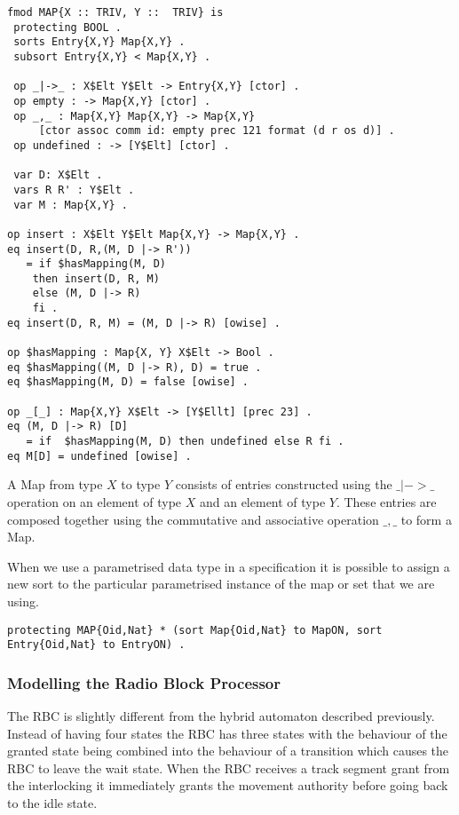 \begin{lstlisting}[caption = The specification of the Map data type in Maude]
fmod MAP{X :: TRIV, Y ::  TRIV} is
 protecting BOOL .
 sorts Entry{X,Y} Map{X,Y} .
 subsort Entry{X,Y} < Map{X,Y} .

 op _|->_ : X$Elt Y$Elt -> Entry{X,Y} [ctor] .
 op empty : -> Map{X,Y} [ctor] .
 op _,_ : Map{X,Y} Map{X,Y} -> Map{X,Y} 
     [ctor assoc comm id: empty prec 121 format (d r os d)] .
 op undefined : -> [Y$Elt] [ctor] .

 var D: X$Elt .
 vars R R' : Y$Elt .
 var M : Map{X,Y} .

op insert : X$Elt Y$Elt Map{X,Y} -> Map{X,Y} .
eq insert(D, R,(M, D |-> R'))
   = if $hasMapping(M, D)
    then insert(D, R, M)
    else (M, D |-> R)
    fi .
eq insert(D, R, M) = (M, D |-> R) [owise] .

op $hasMapping : Map{X, Y} X$Elt -> Bool .
eq $hasMapping((M, D |-> R), D) = true .
eq $hasMapping(M, D) = false [owise] .

op _[_] : Map{X,Y} X$Elt -> [Y$Ellt] [prec 23] .
eq (M, D |-> R) [D]
   = if  $hasMapping(M, D) then undefined else R fi .
eq M[D] = undefined [owise] .
\end{lstlisting}
A Map from type $X$ to type $Y$ consists of entries constructed using the $\_|->\_$ operation on an element of type $X$ and an element of type $Y$. These entries are composed together using the commutative and associative operation $\_,\_$ to form a Map.  

When we use a parametrised data type in a specification it is possible to assign a new sort to the particular parametrised instance of the map or set that we are using.
\begin{center}
\texttt{protecting MAP\{Oid,Nat\}  * (sort Map\{Oid,Nat\} to MapON,
                               sort Entry\{Oid,Nat\} to EntryON) .}
\end{center}




\subsubsection*{Modelling the Radio Block Processor}
The RBC is slightly different from the hybrid automaton described previously. Instead of having four states the RBC has three states with the behaviour of the granted state being combined into the behaviour of a transition which causes the RBC to leave the wait state. When the RBC receives a track segment grant from the interlocking it immediately grants the movement authority before going back to the idle state.
 

